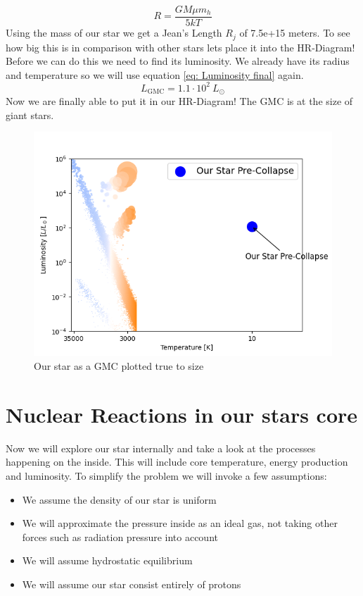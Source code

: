 \documentclass[reprint,english,notitlepage]{revtex4-2}
\begin{document}
\begin{equation}\label{eq: Jeans length}
  R = \frac{GMμ m_h }{5kT} 
\end{equation}
Using the mass of our star we get a Jean's Length $ R_j $ of 7.5e+15 meters. To see how big this is in comparison with other stars lets place it into the HR-Diagram! Before we can do this we need to find its luminosity. We already have its radius and temperature so we will use equation \ref{eq: Luminosity final} again. 
\begin{equation}
  L_{\text{GMC}} = 1.1 ⋅ 10^{2}\ L_{⊙}
\end{equation}
Now we are finally able to put it in our HR-Diagram! The GMC is at the size of giant stars. 
\begin{figure}[h!]
  \centering
  \includegraphics[scale = .5]{figures/HR_diagram_Pre-Collapse}
  \caption{Our star as a GMC plotted true to size}
  \label{fig:figure1}
\end{figure}

\section{Nuclear Reactions in our stars core}
Now we will explore our star internally and take a look at the processes happening on the inside. This will include core temperature, energy production and luminosity. To simplify the problem we will invoke a few assumptions: 
\begin{itemize}
  \item We assume the density of our star is uniform
  \item We will approximate the pressure inside as an ideal gas, not taking other forces such as radiation pressure into account
  \item We will assume hydrostatic equilibrium
  \item We will assume our star consist entirely of protons 
\end{itemize}
\end{document}
